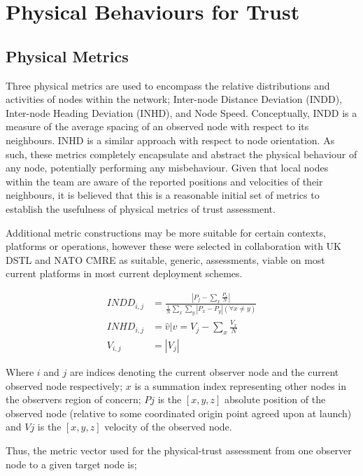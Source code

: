 \documentclass[conference,compsoc,letterpaper]{IEEEtran}
\begin{document}
\section{Physical Behaviours for Trust}\label{sec:physbev}

\subsection{Physical Metrics}

Three physical metrics are used to encompass the relative distributions and activities of nodes within the network; Inter-node Distance Deviation (INDD), Inter-node Heading Deviation (INHD), and Node Speed. 
Conceptually, INDD is a measure of the average spacing of an observed node with respect to its neighbours. 
INHD is a similar approach with respect to node orientation.
As such, these metrics completely encapsulate and abstract the physical behaviour of any node, potentially performing any misbehaviour.
Given that local nodes within the team are aware of the reported positions and velocities of their neighbours, it is believed that this is a reasonable initial set of metrics to establish the usefulness of physical metrics of trust assessment.

Additional metric constructions may be more suitable for certain contexts, platforms or operations, however these were selected in collaboration with UK DSTL and NATO CMRE as suitable, generic, assessments, viable on most current platforms in most current deployment schemes.


\begin{align}
  INDD_{i,j} &= \frac{|P_j - \sum_x \frac{P_x}{N}|}{\frac{1}{N}\sum_x \sum_y{|P_x - P_y| (\forall x \neq y)}}\\
  INHD_{i,j} &= \hat{v} \vert v= V_j - \sum_x{\frac{V_x}{N}}\\
  V_{i,j} &= |V_j|
\end{align}

Where $i$ and $j$ are indices denoting the current observer node and the current observed node respectively; $x$ is a summation index representing other nodes in the observers region of concern; $P{j}$ is the $[x,y,z]$ absolute position of the observed node (relative to some coordinated origin point agreed upon at launch) and $V{j}$ is the $[x,y,z]$ velocity of the observed node.

Thus, the metric vector used for the physical-trust assessment from one observer node to a given target node is;
\end{document}
